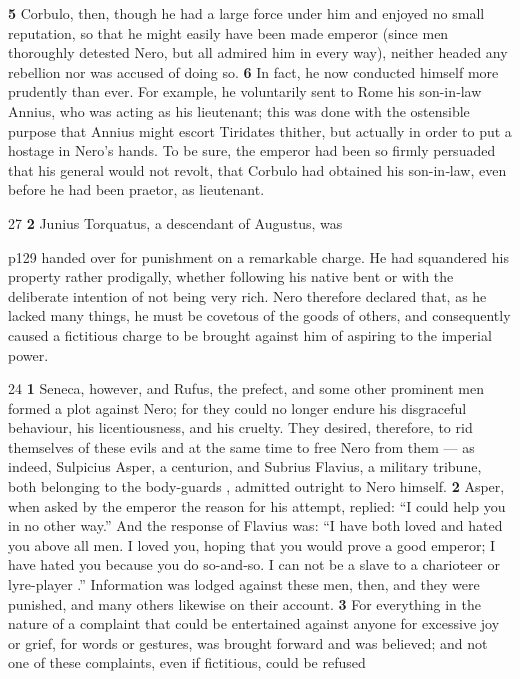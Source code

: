 \textbf{5} Corbulo, then, though he had a large force under him and enjoyed no small reputation, so that he might easily have been made emperor (since men thoroughly detested Nero, but all admired him in every way), neither headed any rebellion nor was accused of doing so. \textbf{6} In fact, he now conducted himself more prudently than ever. For example, he voluntarily sent to Rome his son-in\texthebrew{‑}law Annius, who was acting as his lieutenant; this was done with the ostensible purpose that Annius might escort Tiridates thither, but actually in order to put a hostage in Nero's hands. To be sure, the emperor had been so firmly persuaded that his general would not revolt, that Corbulo had obtained his son-in\texthebrew{‑}law, even before he had been praetor, as lieutenant.

27
\textbf{2} Junius Torquatus, a descendant of Augustus, was

p129 handed over for punishment on a remarkable charge. He had squandered his property rather prodigally, whether following his native bent or with the deliberate intention of not being very rich. Nero therefore declared that, as he lacked many things, he must be covetous of the goods of others, and consequently caused a fictitious charge to be brought against him of aspiring to the imperial power.

24
\textbf{1} Seneca, however, and Rufus, the prefect, and some other prominent men formed a plot against Nero; for they could no longer endure his disgraceful behaviour, his licentiousness, and his cruelty. They desired, therefore, to rid themselves of these evils and at the same time to free Nero from them \texthebrew{—} as indeed, Sulpicius Asper, a centurion, and Subrius Flavius, a military tribune, both belonging to the body-guards , admitted outright to Nero himself. \textbf{2} Asper, when asked by the emperor the reason for his attempt, replied: ``I could help you in no other way.'' And the response of Flavius was: ``I have both loved and hated you above all men. I loved you, hoping that you would prove a good emperor; I have hated you because you do so-and\texthebrew{‑}so. I can not be a slave to a charioteer or lyre-player .'' Information was lodged against these men, then, and they were punished, and many others likewise on their account. \textbf{3} For everything in the nature of a complaint that could be entertained against anyone for excessive joy or grief, for words or gestures, was brought forward and was believed; and not one of these complaints, even if fictitious, could be refused

